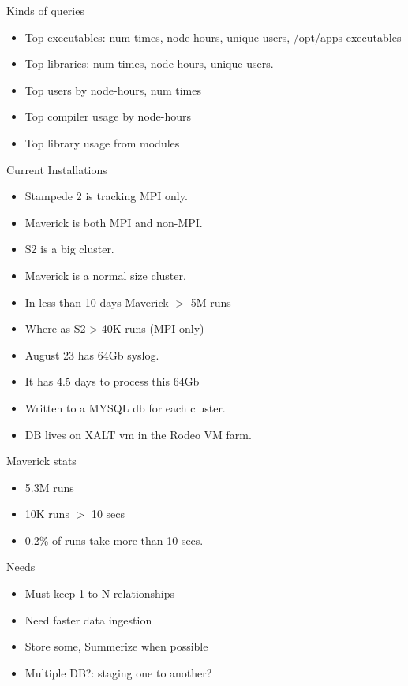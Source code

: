 \documentclass{beamer}
\begin{document}
\begin{frame}{Kinds of queries}
  \begin{itemize}
    \item Top executables: num times, node-hours, unique users,
      /opt/apps executables
    \item Top libraries: num times, node-hours, unique users.
    \item Top users by node-hours, num times
    \item Top compiler usage by node-hours
    \item Top library usage from modules
  \end{itemize}
\end{frame}

\begin{frame}{Current Installations}
  \begin{itemize}
    \item Stampede 2 is tracking MPI only.
    \item Maverick is both MPI and non-MPI.
    \item S2 is a big cluster.
    \item Maverick is a normal size cluster.
    \item In less than 10 days Maverick $>$ 5M runs
    \item Where as S2 > 40K runs (MPI only)
    \item August 23 has 64Gb syslog. 
    \item It has 4.5 days to process this 64Gb
    \item Written to a MYSQL db for each cluster.
    \item DB lives on XALT vm in the Rodeo VM farm.
  \end{itemize}
\end{frame}

\begin{frame}{Maverick stats}
  \begin{itemize}
    \item 5.3M runs
    \item 10K runs $>$ 10 secs
    \item 0.2\% of runs take more than 10 secs.
  \end{itemize}
\end{frame}

\begin{frame}{Needs}
  \begin{itemize}
    \item Must keep 1 to N relationships
    \item Need faster data ingestion
    \item Store some, Summerize when possible
    \item Multiple DB?: staging one to another?
  \end{itemize}
\end{frame}
\end{document}
